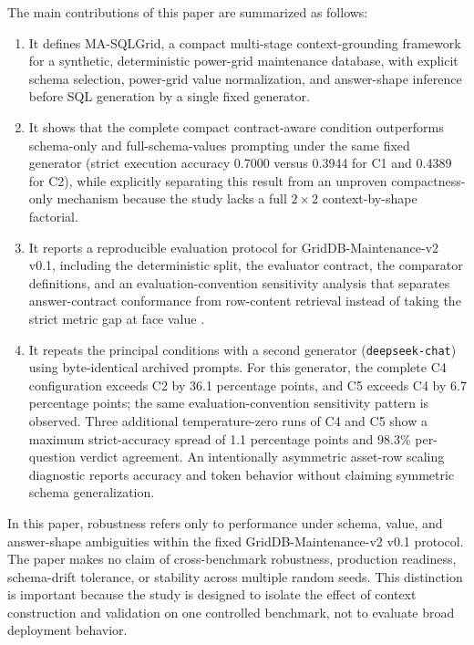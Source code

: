 \documentclass[cmc,article,submit,moreauthors,pdftex]{Definitions/tsp}
\begin{document}
The main contributions of this paper are summarized as follows:
\begin{enumerate}[label=(\arabic*)]
\item It defines MA-SQLGrid, a compact multi-stage context-grounding framework for a synthetic, deterministic power-grid maintenance database, with explicit schema selection, power-grid value normalization, and answer-shape inference before SQL generation by a single fixed generator.
\item It shows that the complete compact contract-aware condition outperforms schema-only and full-schema-values prompting under the same fixed generator (strict execution accuracy 0.7000 versus 0.3944 for C1 and 0.4389 for C2), while explicitly separating this result from an unproven compactness-only mechanism because the study lacks a full $2\times2$ context-by-shape factorial.
\item It reports a reproducible evaluation protocol for GridDB-Maintenance-v2 v0.1, including the deterministic split, the evaluator contract, the comparator definitions, and an evaluation-convention sensitivity analysis that separates answer-contract conformance from row-content retrieval instead of taking the strict metric gap at face value \cite{zhong2020semantic,lee2021kaggledbqa,lei2024spider}.
\item It repeats the principal conditions with a second generator (\texttt{deepseek-chat}) using byte-identical archived prompts. For this generator, the complete C4 configuration exceeds C2 by 36.1 percentage points, and C5 exceeds C4 by 6.7 percentage points; the same evaluation-convention sensitivity pattern is observed. Three additional temperature-zero runs of C4 and C5 show a maximum strict-accuracy spread of 1.1 percentage points and 98.3\% per-question verdict agreement. An intentionally asymmetric asset-row scaling diagnostic reports accuracy and token behavior without claiming symmetric schema generalization.
\end{enumerate}

In this paper, robustness refers only to performance under schema, value, and answer-shape ambiguities within the fixed GridDB-Maintenance-v2 v0.1 protocol. The paper makes no claim of cross-benchmark robustness, production readiness, schema-drift tolerance, or stability across multiple random seeds. This distinction is important because the study is designed to isolate the effect of context construction and validation on one controlled benchmark, not to evaluate broad deployment behavior.
\end{document}
